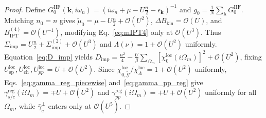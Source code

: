 \documentclass[11pt,a4paper]{article}
\numberwithin{equation}{section}
\theoremstyle{plain}
\theoremstyle{definition}
\providecommand{\vk}{\mathbf{k}}
\begin{document}
\begin{proof}
Define $G_0^{\mathrm{HF}}(\vk,i\omega_n) = (i\omega_n + \mu - U\frac{n}{2} - \epsilon_{\vk})^{-1}$
and $g_0 = \frac{1}{N}\sum_{\vk} G_0^{\mathrm{HF}}$. Matching $n_0 = n$ gives
$\tilde{\mu}_0 = \mu - U\frac{n}{2} + \mathcal{O}(U^2)$,
$\Delta B_{\mathrm{kin}} = \mathcal{O}(U)$, and $B_{\mathrm{IPT}}^{(4)} = \mathcal{O}(U^{-1})$,
modifying Eq.~\eqref{eq:mIPT4} only at $\mathcal{O}(U^3)$. Thus
$\Sigma_{\mathrm{imp}} = U\frac{n}{2} + \Sigma_{\mathrm{imp}}^{(2)} + \mathcal{O}(U^3)$
and $\Lambda(\nu) = 1 + \mathcal{O}(U^2)$ uniformly. Equation~\eqref{eq:D_imp} yields
$D_{\mathrm{imp}} = \frac{n^2}{4} - \frac{U}{\beta}\sum_{\Omega_m}[\chi_0^{\mathrm{loc}}(i\Omega_m)]^2 + \mathcal{O}(U^2)$,
fixing $U_{\mathrm{sp}}^{\mathrm{loc}}, U_{\mathrm{ch}}^{\mathrm{loc}}, U_{pp}^{\mathrm{loc}} = U + \mathcal{O}(U^2)$.
Since $\chi_{0,\tilde{\mathcal{G}}}^{\mathrm{loc}}/\chi_\Lambda^{\mathrm{loc}} = 1 + \mathcal{O}(U^2)$
uniformly, Eqs.~\eqref{eq:gamma_reg_piecewise} and~\eqref{eq:gamma_pp_reg} give
$\bar{\gamma}_{s/c}^{\mathrm{reg}}(i\Omega_m) = \mp U + \mathcal{O}(U^2)$ and
$\bar{\gamma}_{pp}^{\mathrm{reg}}(i\Omega_m) = +U + \mathcal{O}(U^2)$ uniformly for all
$\Omega_m$, while $\bar{\gamma}_c^\perp$ enters only at $\mathcal{O}(U^5)$.


\end{proof}
\end{document}
